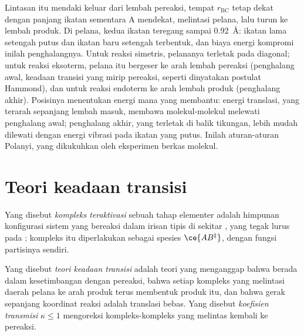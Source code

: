 Lintasan itu mendaki keluar dari lembah pereaksi, tempat $r_{\mathrm{BC}}$ tetap
dekat dengan panjang ikatan  sementara A mendekat, melintasi pelana, lalu
turun ke lembah produk. Di pelana, kedua ikatan teregang sampai
\qty{0.92}{\angstrom}: ikatan lama setengah putus dan ikatan baru setengah
terbentuk, dan biaya energi kompromi inilah penghalangnya. Untuk reaksi
simetris, pelananya terletak pada diagonal; untuk reaksi eksoterm, pelana itu
bergeser ke arah lembah pereaksi (penghalang awal, keadaan transisi yang mirip
pereaksi, seperti dinyatakan postulat Hammond), dan untuk reaksi endoterm ke
arah lembah produk (penghalang akhir). Posisinya menentukan energi mana yang
membantu: energi translasi, yang terarah sepanjang lembah masuk, membawa
molekul-molekul melewati penghalang awal; penghalang akhir, yang terletak di
balik tikungan, lebih mudah dilewati dengan energi vibrasi pada ikatan yang
putus. Inilah aturan-aturan Polanyi, yang dikukuhkan oleh eksperimen berkas
molekul.

\section{Teori keadaan transisi}

\begin{definition}\label{def:b3:rate-theories:activated-complex}
Yang disebut \emph{kompleks teraktivasi} sebuah
tahap elementer adalah himpunan konfigurasi sistem yang bereaksi dalam irisan
tipis di sekitar , yang tegak lurus pada ;
kompleks itu diperlakukan sebagai spesies $\ce{AB^{\ddagger}}$, dengan fungsi
partisinya sendiri.
\end{definition}

\begin{definition}\label{def:b3:rate-theories:tst}
Yang disebut \emph{teori keadaan transisi} adalah
teori yang menganggap bahwa  berada dalam
kesetimbangan dengan pereaksi, bahwa setiap kompleks yang melintasi daerah
pelana ke arah produk terus membentuk produk itu, dan bahwa gerak sepanjang
koordinat reaksi adalah translasi bebas. Yang disebut \emph{koefisien
transmisi} $\kappa \le 1$ mengoreksi kompleks-kompleks
yang melintas kembali ke pereaksi.
\end{definition}

